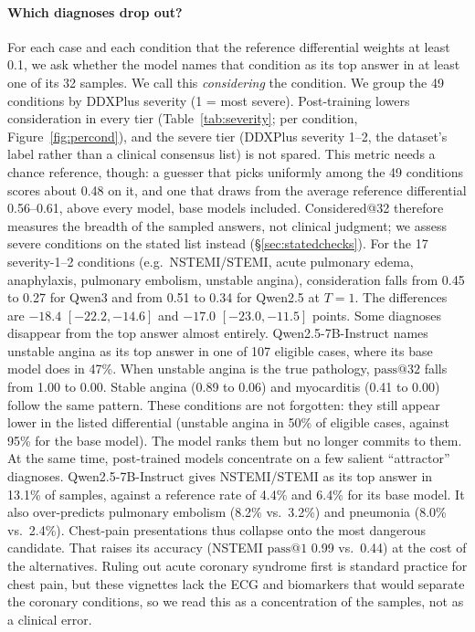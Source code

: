 \documentclass[wcp]{jmlr}
\makeatletter
\newcommand{\passk}[1]{\mathrm{pass@}#1}
\makeatother
\begin{document}
\paragraph{Which diagnoses drop out?}
For each case and each condition that the reference differential weights at least 0.1, we ask whether the model names that condition as its top answer in at least one of its 32 samples. We call this \emph{considering} the condition.
We group the 49 conditions by DDXPlus severity (1 = most severe).
Post-training lowers consideration in every tier (Table~\ref{tab:severity}; per condition, Figure~\ref{fig:percond}), and the severe tier (DDXPlus severity 1--2, the dataset's label rather than a clinical consensus list) is not spared. This metric needs a chance reference, though: a guesser that picks uniformly among the 49 conditions scores about 0.48 on it, and one that draws from the average reference differential 0.56--0.61, above every model, base models included. Considered@32 therefore measures the breadth of the sampled answers, not clinical judgment; we assess severe conditions on the stated list instead (\S\ref{sec:statedchecks}).
For the 17 severity-1--2 conditions (e.g.\ NSTEMI/STEMI, acute pulmonary edema, anaphylaxis, pulmonary embolism, unstable angina), consideration falls from 0.45 to 0.27 for Qwen3 and from 0.51 to 0.34 for Qwen2.5 at $T{=}1$. The differences are $-18.4$ $[-22.2,-14.6]$ and $-17.0$ $[-23.0,-11.5]$ points.
Some diagnoses disappear from the top answer almost entirely.
Qwen2.5-7B-Instruct names unstable angina as its top answer in one of 107 eligible cases, where its base model does in 47\%. When unstable angina is the true pathology, $\passk{32}$ falls from 1.00 to 0.00. Stable angina (0.89 to 0.06) and myocarditis (0.41 to 0.00) follow the same pattern.
These conditions are not forgotten: they still appear lower in the listed differential (unstable angina in 50\% of eligible cases, against 95\% for the base model). The model ranks them but no longer commits to them.
At the same time, post-trained models concentrate on a few salient ``attractor'' diagnoses.
Qwen2.5-7B-Instruct gives NSTEMI/STEMI as its top answer in 13.1\% of samples, against a reference rate of 4.4\% and 6.4\% for its base model. It also over-predicts pulmonary embolism (8.2\% vs.\ 3.2\%) and pneumonia (8.0\% vs.\ 2.4\%).
Chest-pain presentations thus collapse onto the most dangerous candidate. That raises its accuracy (NSTEMI $\passk{1}$ 0.99 vs.\ 0.44) at the cost of the alternatives. Ruling out acute coronary syndrome first is standard practice for chest pain, but these vignettes lack the ECG and biomarkers that would separate the coronary conditions, so we read this as a concentration of the samples, not as a clinical error.
\end{document}
